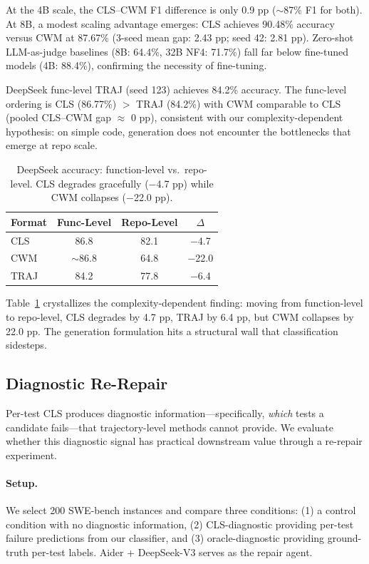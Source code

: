 \documentclass[11pt,a4paper]{article}
\begin{document}
At the 4B scale, the CLS--CWM F1 difference is only 0.9 pp ($\sim$87\% F1 for both).
At 8B, a modest scaling advantage emerges: CLS achieves 90.48\% accuracy versus CWM at 87.67\% (3-seed mean gap: 2.43 pp; seed 42: 2.81 pp).
Zero-shot LLM-as-judge baselines (8B: 64.4\%, 32B NF4: 71.7\%) fall far below fine-tuned models (4B: 88.4\%), confirming the necessity of fine-tuning.

DeepSeek func-level TRAJ (seed 123) achieves 84.2\% accuracy.
The func-level ordering is CLS (86.77\%) $>$ TRAJ (84.2\%) with CWM comparable to CLS (pooled CLS--CWM gap $\approx$ 0 pp), consistent with our complexity-dependent hypothesis: on simple code, generation does not encounter the bottlenecks that emerge at repo scale.

\begin{table}[t]
\centering
\small
\begin{tabular}{lccc}
\toprule
\textbf{Format} & \textbf{Func-Level} & \textbf{Repo-Level} & \textbf{$\Delta$} \\
\midrule
CLS & 86.8 & 82.1 & $-$4.7 \\
CWM & $\sim$86.8 & 64.8 & $-$22.0 \\
TRAJ & 84.2 & 77.8 & $-$6.4 \\
\bottomrule
\end{tabular}
\caption{DeepSeek accuracy: function-level vs.\ repo-level. CLS degrades gracefully ($-$4.7 pp) while CWM collapses ($-$22.0 pp).}
\label{tab:func-vs-repo}
\end{table}

Table~\ref{tab:func-vs-repo} crystallizes the complexity-dependent finding: moving from function-level to repo-level, CLS degrades by 4.7 pp, TRAJ by 6.4 pp, but CWM collapses by 22.0 pp.
The generation formulation hits a structural wall that classification sidesteps.

\subsection{Diagnostic Re-Repair}
\label{sec:rerepair}

Per-test CLS produces diagnostic information---specifically, \emph{which} tests a candidate fails---that trajectory-level methods cannot provide.
We evaluate whether this diagnostic signal has practical downstream value through a re-repair experiment.

\paragraph{Setup.}
We select 200 SWE-bench instances and compare three conditions: (1) a control condition with no diagnostic information, (2) CLS-diagnostic providing per-test failure predictions from our classifier, and (3) oracle-diagnostic providing ground-truth per-test labels.
Aider + DeepSeek-V3 serves as the repair agent.
\end{document}
